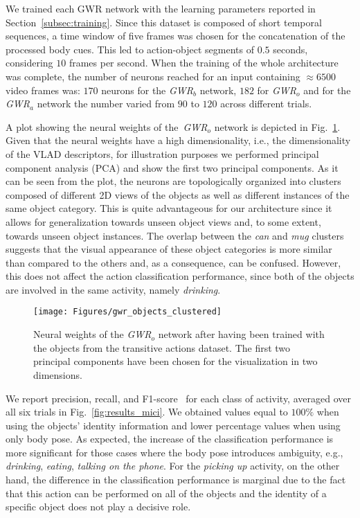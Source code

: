 \documentclass[5p,times]{elsarticle}
\begin{document}
We trained each GWR network with the learning parameters reported in Section~\ref{subsec:training}. 
Since this dataset is composed of short temporal sequences, a time window of five frames was chosen for the concatenation of the processed body cues. 
This led to action-object segments of $0.5$ seconds, considering $10$ frames per second. 
When the training of the whole architecture was complete, the number of neurons reached for an input containing $\approx6500$ video frames was: $170$ neurons for the \textit{GWR}$_b$ network, $182$ for \textit{GWR}$_o$ and for the \textit{GWR}$_a$ network the number varied from $90$ to $120$ across different trials.

A plot showing the neural weights of the~\textit{GWR}$_o$ network is depicted in Fig.~\ref{fig:obj_clusters}. 
Given that the neural weights have a high dimensionality, i.e., the dimensionality of the VLAD descriptors, for illustration purposes we performed principal component analysis (PCA) and show the first two principal components.
As it can be seen from the plot, the neurons are topologically organized into clusters composed of different 2D views of the objects as well as different instances of the same object category. 
This is quite advantageous for our architecture since it allows for generalization towards unseen object views and, to some extent, towards unseen object instances.
The overlap between the \textit{can} and \textit{mug} clusters suggests that the visual appearance of these object categories is more similar than compared to the others and, as a consequence, can be confused.
However, this does not affect the action classification performance, since both of the objects are involved in the same activity, namely \textit{drinking}. 

\begin{figure}
\begin{center}
\texttt{[image: Figures/gwr\_objects\_clustered]}
\caption{Neural weights of the \textit{GWR}$_o$ network after having been trained with the objects from the transitive actions dataset. The first two principal components have been chosen for the visualization in two dimensions.}
\label{fig:obj_clusters}
\end{center}
\end{figure}

We report precision, recall, and F1-score~\citep{sokolova2009systematic} for each class of activity, averaged over all six trials in Fig.~\ref{fig:results_mici}.
We obtained values equal to $100\%$ when using the objects' identity information and lower percentage values when using only body pose.
As expected, the increase of the classification performance is more significant for those cases where the body pose introduces ambiguity, e.g., \textit{drinking}, \textit{eating}, \textit{talking on the phone}. 
For the \textit{picking up} activity, on the other hand, the difference in the classification performance is marginal due to the fact that this action can be performed on all of the objects and the identity of a specific object does not play a decisive role.
\end{document}
